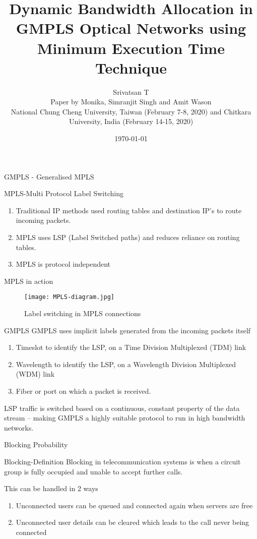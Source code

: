 \documentclass{beamer}
\title{Dynamic Bandwidth Allocation in GMPLS Optical Networks using Minimum Execution Time Technique}
\author{Srivatsan T\\Paper by Monika, Simranjit Singh and Amit Wason\\
National Chung Cheng University, Taiwan (February 7-8, 2020) and Chitkara University, India (February 14-15, 2020)}
\institute{IITH}
\date{\today}
\begin{document}
\begin{frame}
  \titlepage
\end{frame}
\begin{frame}{GMPLS - Generalised MPLS}
  \begin{block}{MPLS-Multi Protocol Label Switching}
    \begin{enumerate}
      \item Traditional IP methods used routing tables and destination IP's to route incoming packets.
      \item MPLS uses LSP (Label Switched paths) and reduces reliance on routing tables.
      \item MPLS is protocol independent
    \end{enumerate}
  \end{block}
\end{frame}
\begin{frame}{MPLS in action}
  \begin{figure}[!]
    \centering
    \texttt{[image: MPLS-diagram.jpg]}
    \caption{Label switching in MPLS connections}
  \end{figure}
\end{frame}
\begin{frame}{GMPLS}
  GMPLS uses implicit labels generated from the incoming packets itself
  \begin{block}{}
    \begin{enumerate}
      \item Timeslot to identify the LSP, on a Time Division Multiplexed (TDM) link
      \item Wavelength to identify the LSP, on a Wavelength Division Multiplexed (WDM) link
      \item Fiber or port on which a packet is received.
    \end{enumerate}
  \end{block}
  LSP traffic is switched based on a continuous, constant property of the data stream –
  making GMPLS a highly suitable protocol to run in high bandwidth networks.
\end{frame}
\begin{frame}{Blocking Probability}
  \begin{block}{Blocking-Definition}
    Blocking in telecommunication systems is when a circuit group is fully occupied and unable to accept further calls.
  \end{block}
  This can be handled in 2 ways
  \begin{block}{}
    \begin{enumerate}
      \item Unconnected users can be queued and connected again when servers are free
      \item Unconnected user details can be cleared which leads to the call never being connected
    \end{enumerate}
  \end{block}
\end{frame}
\end{document}
